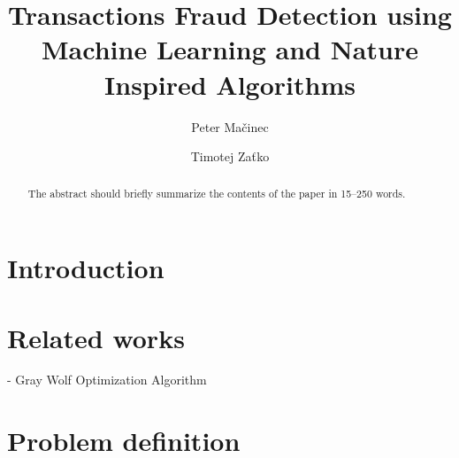\documentclass[runningheads]{llncs}
\begin{document}
%
\title{Transactions Fraud Detection using Machine Learning and Nature Inspired Algorithms}
%
%
\author{Peter Mačinec \and Timotej Zaťko}
%
%
%
\maketitle              %
%
\begin{abstract}
The abstract should briefly summarize the contents of the paper in
15--250 words.

\end{abstract}
%
%
%
\section{Introduction}


\section{Related works}


- Gray Wolf Optimization Algorithm \cite{Mirjalili_Mirjalili_Lewis_2014}

\section{Problem definition}

\end{document}
